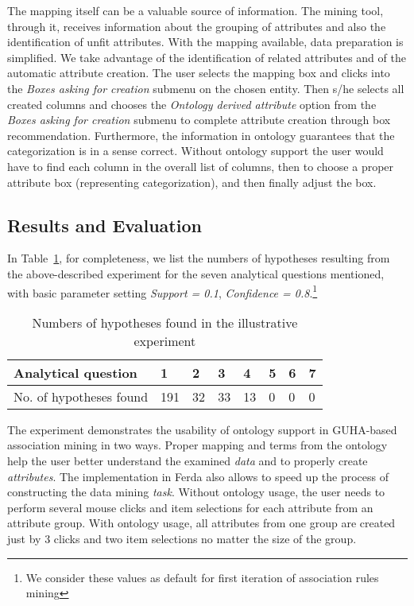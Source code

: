 The mapping itself can be a valuable source of information. 
The mining tool, through it, receives information about the grouping %
of attributes and also the identification of unfit attributes.
%
With the mapping available, data preparation is simplified. 
We take advantage of the identification of related attributes and of the automatic attribute creation. 
The user selects the mapping box and clicks into the \emph{Boxes asking for creation} submenu on the chosen entity. 
Then s/he selects all created columns and chooses the \emph{Ontology derived attribute} option from the \emph{Boxes asking for creation} submenu to complete attribute creation through box recommendation.
%
%
Furthermore, the information in ontology guarantees that the categorization is in a sense correct. 
Without ontology support the user would have to find each column in the overall list of columns, then to choose a proper attribute box (representing categorization), and then finally adjust the box. 

\subsection{Results and Evaluation}\label{Results}
In Table~\ref{tab:Hypotheses}, for completeness, we list the numbers of hypotheses resulting from the above-described experiment for the seven analytical questions mentioned, with basic parameter setting \emph{Support = 0.1}, \emph{Confidence = 0.8}.\footnote{We consider these values as default for first iteration of association rules mining} 

\begin{table}[ht]
	\centering
		\begin{tabular}{|p{}|p{}|p{0,3cm}|p{}|p{}|p{}|p{}|p{}|}
			\hline
			Analytical question & 1 & 2 & 3 & 4 & 5 & 6 & 7 \\
			\hline
			No. of hypotheses found & 191 & 32 & 33 & 13 & 0 & 0 & 0 \\
			\hline
		\end{tabular}
	\caption{Numbers of hypotheses found in the illustrative experiment}
	\label{tab:Hypotheses}
\end{table}

The experiment demonstrates the usability of ontology support in GUHA-based association mining in two ways. 
Proper mapping and terms from the ontology help the user better understand the examined \emph{data} and to properly create \emph{attributes}. The implementation in Ferda also allows to speed up the process of constructing the data mining \emph{task}.
Without ontology usage, the user needs to perform several mouse clicks and item selections for each attribute from an attribute group. With ontology usage, all attributes from one group are created just by 3 clicks and two item selections no matter the size of the group.